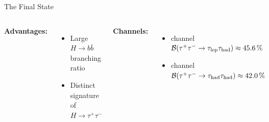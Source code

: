 \documentclass[11pt, xcolor={dvipsnames}, aspectratio=169]{beamer}
\begin{document}

\begin{frame}{The \allbold{\bbtautau} Final State}

  \begin{columns}[onlytextwidth]

    \textbf{Advantages:}
    \begin{itemize}
      \setlength{\itemsep}{0.5em}
    \item Large $H \to b\bar{b}$ branching ratio
    \item Distinct signature of $H \to \tau^+\tau^-$
    \end{itemize}

    \vspace{1em}
    \pause

    \textbf{Channels:}
    \begin{itemize}
      \setlength{\itemsep}{0.5em}
    \item<2-> \lephad channel\\
      $\mathcal{B}(\tau^+\tau^- \to \tau_{\text{lep}}\tau_{\text{had}}) \approx \SI{45.6}{\percent}$

    \item<3-> \hadhad channel\\
      $\mathcal{B}(\tau^+\tau^- \to \tau_{\text{had}}\tau_{\text{had}}) \approx \SI{42.0}{\percent}$
    \end{itemize}

     \centering


\end{columns}
\end{frame}
\end{document}
